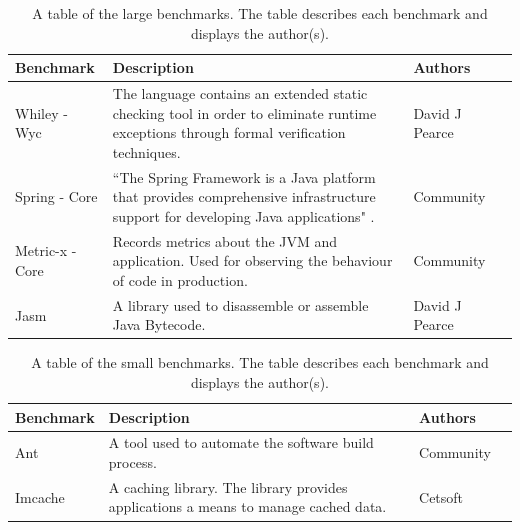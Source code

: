 \begin{table}[H]
\centering
\begin{tabular}{|l|l|l|l|}
\hline
{\bf Benchmark}       &  {\bf Description}  & {\bf Authors}   \\ \hline
Whiley - Wyc         &     \begin{minipage}[t]{0.6\columnwidth} The language contains an extended static checking tool in order to eliminate runtime exceptions through formal verification techniques. 
\end{minipage}     & David J Pearce          \\ \hline
Spring - Core   &  \begin{minipage}[t]{0.6\columnwidth} ``The Spring Framework is a Java platform that provides comprehensive infrastructure support for developing Java applications" \cite{spring} .
\end{minipage}       & Community \\ \hline
Metric-x - Core &     \begin{minipage}[t]{0.6\columnwidth} Records metrics about the JVM and application. Used for observing the behaviour of code in production.
\end{minipage}        & Community \\ \hline
Jasm              &     \begin{minipage}[t]{0.6\columnwidth} A library used to disassemble or assemble Java Bytecode. 
\end{minipage}          & David J Pearce \\ \hline

\end{tabular}
\caption{A table of the large benchmarks. The table describes each benchmark and displays the author(s).}
\label{large_testdes}
\end{table}

\begin{table}[H]
\centering
\begin{tabular}{|l|l|l|l|}
\hline
{\bf Benchmark}   & {\bf Description}  & {\bf Authors}  \\ \hline
Ant             &    \begin{minipage}[t]{0.6\columnwidth} A tool used to automate the software build process. 
\end{minipage}  & Community \\ \hline
Imcache &      \begin{minipage}[t]{0.6\columnwidth} A caching library. The library provides applications a means to manage cached data. 
\end{minipage}     & Cetsoft \\ \hline
\end{tabular}
\caption{A table of the small benchmarks. The table describes each benchmark and displays the author(s).}
\label{small_testdes}
\end{table}


